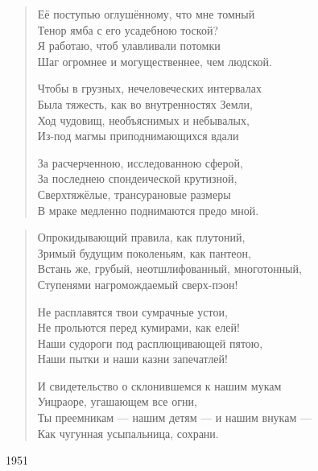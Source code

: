 \documentclass{beamer}
\begin{document}

\begin{frame}

\begin{verse}
Её поступью оглушённому, что мне томный\\
Тенор ямба с его усадебною тоской?\\
Я работаю, чтоб улавливали потомки\\
Шаг огромнее и могущественнее, чем людской.

Чтобы в грузных, нечеловеческих интервалах\\
Была тяжесть, как во внутренностях Земли,\\
Ход чудовищ, необъяснимых и небывалых,\\
Из-под магмы приподнимающихся вдали

За расчерченною, исследованною сферой,\\
За последнею спондеической крутизной,\\
Сверхтяжёлые, трансурановые размеры\\
В мраке медленно поднимаются предо мной.

\end{verse}


\end{frame}


\begin{frame}

\begin{verse}
Опрокидывающий правила, как плутоний,\\
Зримый будущим поколеньям, как пантеон,\\
Встань же, грубый, неотшлифованный, многотонный,\\
Ступенями нагромождаемый сверх-пэон!

Не расплавятся твои сумрачные устои,\\
Не прольются перед кумирами, как елей!\\
Наши судороги под расплющивающей пятою,\\
Наши пытки и наши казни запечатлей!

И свидетельство о склонившемся к нашим мукам\\
Уицраоре, угашающем все огни, \\
Ты преемникам — нашим детям — и нашим внукам —\\
Как чугунная усыпальница, сохрани. 
\end{verse}
1951
\end{frame}
\end{document}
